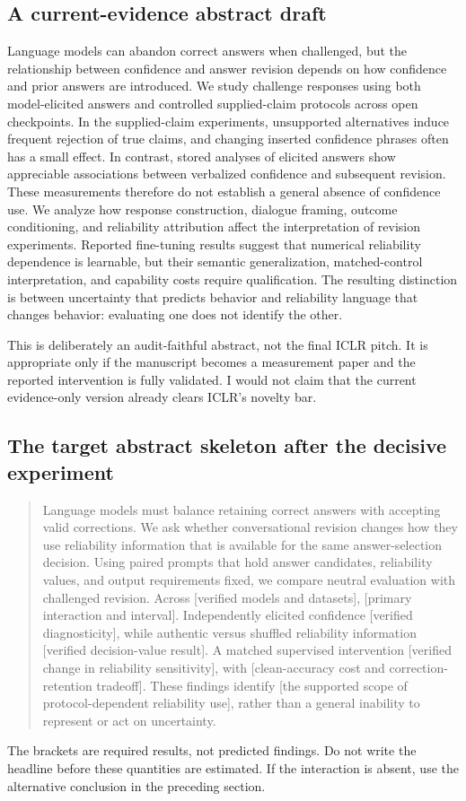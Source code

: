 \documentclass[11pt]{article}
\begin{document}
\subsection{A current-evidence abstract draft}
\begin{takeaway}
Language models can abandon correct answers when challenged, but the relationship between confidence and answer revision depends on how confidence and prior answers are introduced. We study challenge responses using both model-elicited answers and controlled supplied-claim protocols across open checkpoints. In the supplied-claim experiments, unsupported alternatives induce frequent rejection of true claims, and changing inserted confidence phrases often has a small effect. In contrast, stored analyses of elicited answers show appreciable associations between verbalized confidence and subsequent revision. These measurements therefore do not establish a general absence of confidence use. We analyze how response construction, dialogue framing, outcome conditioning, and reliability attribution affect the interpretation of revision experiments. Reported fine-tuning results suggest that numerical reliability dependence is learnable, but their semantic generalization, matched-control interpretation, and capability costs require qualification. The resulting distinction is between uncertainty that predicts behavior and reliability language that changes behavior: evaluating one does not identify the other.
\end{takeaway}
This is deliberately an audit-faithful abstract, not the final ICLR pitch. It is appropriate only if the manuscript becomes a measurement paper and the reported intervention is fully validated. I would not claim that the current evidence-only version already clears ICLR's novelty bar.

\subsection{The target abstract skeleton after the decisive experiment}
\begin{quote}
Language models must balance retaining correct answers with accepting valid corrections. We ask whether conversational revision changes how they use reliability information that is available for the same answer-selection decision. Using paired prompts that hold answer candidates, reliability values, and output requirements fixed, we compare neutral evaluation with challenged revision. Across [verified models and datasets], [primary interaction and interval]. Independently elicited confidence [verified diagnosticity], while authentic versus shuffled reliability information [verified decision-value result]. A matched supervised intervention [verified change in reliability sensitivity], with [clean-accuracy cost and correction-retention tradeoff]. These findings identify [the supported scope of protocol-dependent reliability use], rather than a general inability to represent or act on uncertainty.
\end{quote}
The brackets are required results, not predicted findings. Do not write the headline before these quantities are estimated. If the interaction is absent, use the alternative conclusion in the preceding section.
\end{document}
